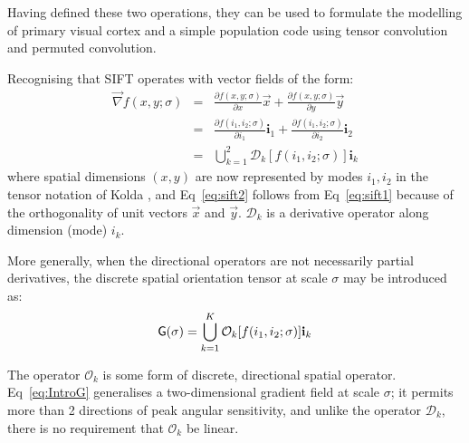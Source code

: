 Having defined these two operations, they can be used to formulate the modelling of primary visual cortex and a simple population code using tensor convolution and permuted convolution. 

Recognising that SIFT operates with vector fields of the form:
\begin{eqnarray}
\label{eq:sift1}
\vec{\nabla} f(x,y;\sigma) &=& \frac{\partial f(x,y;\sigma)}{\partial x}\vec{x} + \frac{\partial f(x,y;\sigma)}{\partial y}\vec{y}\nonumber \\
&=& \frac{\partial f(i_1,i_2;\sigma)}{\partial i_1}\mathbf{i}_1 + \frac{\partial f(i_1,i_2;\sigma)}{\partial i_2}\mathbf{i}_2\\
\label{eq:sift2}
&=& \bigcup_{k=1}^2 \mathcal{D}_k [ f(i_1,i_2;\sigma) ] \mathbf{i}_k 
\end{eqnarray}
where spatial dimensions $(x,y)$ are now represented by modes $i_1,i_2$ in the tensor notation of Kolda \citep{kolda2009tensor}, and Eq~\ref{eq:sift2} follows from Eq~\ref{eq:sift1} because of the orthogonality of unit vectors $\vec{x}$ and $\vec{y}$.  $\mathcal{D}_k$ is a derivative operator along dimension (mode) $i_k$. 

More generally, when the directional operators are not necessarily partial derivatives, the discrete spatial orientation tensor at scale $\sigma$ may be introduced as:
\begin{equation}
\mathsf{G(\sigma)}  = \bigcup_{k=1}^K \mathcal{O}_k [ f(i_1,i_2;\sigma) ] \mathbf{i}_k 
\label{eq:IntroG}
\end{equation}

The operator $\mathcal{O}_k$ is some form of discrete, directional spatial operator. Eq~\ref{eq:IntroG} generalises a two-dimensional gradient field at scale $\sigma$; it permits more than 2 directions of peak angular sensitivity, and unlike the operator $\mathcal{D}_k$, there is no requirement that $\mathcal{O}_k$ be linear.

